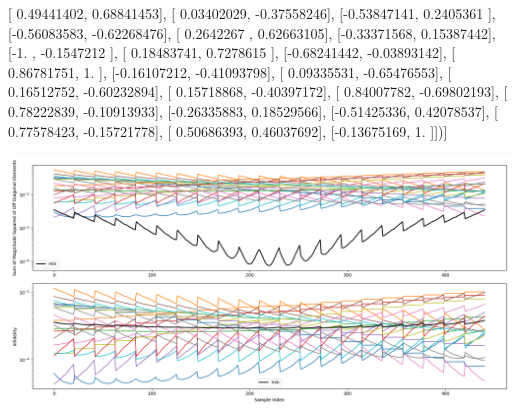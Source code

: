 \documentclass{article}
\begin{document}
       [ 0.49441402,  0.68841453],
       [ 0.03402029, -0.37558246],
       [-0.53847141,  0.2405361 ],
       [-0.56083583, -0.62268476],
       [ 0.2642267 ,  0.62663105],
       [-0.33371568,  0.15387442],
       [-1.        , -0.1547212 ],
       [ 0.18483741,  0.7278615 ],
       [-0.68241442, -0.03893142],
       [ 0.86781751,  1.        ],
       [-0.16107212, -0.41093798],
       [ 0.09335531, -0.65476553],
       [ 0.16512752, -0.60232894],
       [ 0.15718868, -0.40397172],
       [ 0.84007782, -0.69802193],
       [ 0.78222839, -0.10913933],
       [-0.26335883,  0.18529566],
       [-0.51425336,  0.42078537],
       [ 0.77578423, -0.15721778],
       [ 0.50686393,  0.46037692],
       [-0.13675169,  1.        ]])]
\begin{center}
\includegraphics[scale=.9]{report_pickled_controls228/control_dpn_all.png}

\end{center}
\end{document}
